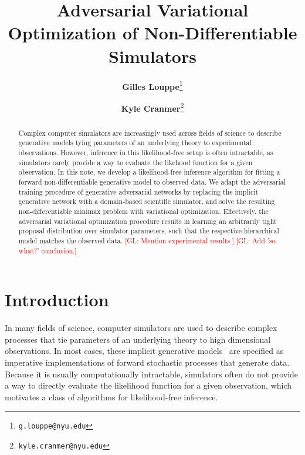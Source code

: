 \documentclass[twocolumn,superscriptaddress,aps]{revtex4-1}
\newcommand{\glnote}[1]{\textcolor{red}{[GL: #1]}}
\theoremstyle{plain}
\begin{document}

\title{\Large{Adversarial Variational Optimization of Non-Differentiable Simulators}}
\vspace{1cm}
\author{\small{\bf Gilles Louppe}\thanks{\texttt{g.louppe@nyu.edu}}}
\author{\small{\bf Kyle Cranmer}\thanks{\texttt{kyle.cranmer@nyu.edu}}}

\begin{abstract}

Complex computer simulators are increasingly used across fields of science to
describe generative models tying parameters of an underlying theory to
experimental observations. However, inference in this likelihood-free setup is often
intractable, as simulators rarely provide a way to evaluate the likehood
function for a given observation. In this note, we develop a likelihood-free
inference algorithm for fitting a forward non-differentiable generative model to
observed data. We adapt the adversarial training procedure of generative
adversarial networks by replacing the implicit generative network with a
domain-based scientific simulator, and solve the resulting non-differentiable
minimax problem with variational optimization. Effectively, the adversarial
variational optimization procedure results in learning an arbitrarily tight
proposal distribution over simulator parameters, such that the respective
hierarchical model matches the observed data.
\glnote{Mention experimental results.}
\glnote{Add 'so what?' conclusion.}


\end{abstract}

\maketitle


\section{Introduction}

In many fields of science, computer simulators are used to describe complex
processes that tie parameters of an underlying theory to high dimensional
observations. In most cases, these implicit generative
models~\citep{2016arXiv161003483M} are specified as imperative implementations
of forward stochastic processes that generate data. Because it is usually
computationally intractable, simulators often do not provide a way to directly
evaluate the likelihood function for a given observation,  which motivates a
class of algorithms for likelihood-free inference.
\end{document}

